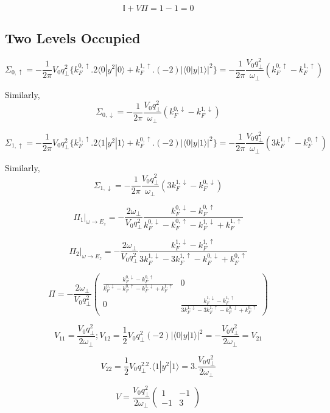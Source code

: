 \[\mathbb{I}+V\Pi=1-1=0\]

\subsection{Two Levels Occupied}

\[\Sigma_{0,\uparrow}=-\frac{1}{2\pi} V_0 q_\perp^2 \{k_F^{0,\uparrow}.2\langle 0|y^2|0\rangle + k_F^{1,\uparrow}.(-2)|\langle 0|y|1\rangle|^2\}=-\frac{1}{2\pi} \frac{V_0 q_\perp^2}{\omega_{\perp}}(k_F^{0,\uparrow}-k_F^{1,\uparrow})\]

Similarly,
\[\Sigma_{0,\downarrow}=-\frac{1}{2\pi} \frac{V_0 q_\perp^2}{\omega_{\perp}} (k_F^{0,\downarrow}-k_F^{1,\downarrow})\]

\[\Sigma_{1,\uparrow}=-\frac{1}{2\pi} V_0 q_\perp^2 \{k_F^{1,\uparrow}.2\langle 1|y^2|1\rangle + k_F^{0,\uparrow}.(-2) |\langle 0|y|1\rangle|^2 \} = -\frac{1}{2\pi} \frac{V_0 q_\perp^2}{\omega_{\perp}} (3k_F^{1,\uparrow}-k_F^{0,\uparrow})\]

Similarly, 
\[\Sigma_{1,\downarrow}=-\frac{1}{2\pi} \frac{V_0 q_\perp^2}{\omega_{\perp}} (3k_F^{1,\downarrow}-k_F^{0,\downarrow})\]

\[\Pi_1|_{\omega\rightarrow E_z}=-\frac{2\omega_{\perp}}{V_0 q_\perp^2} \frac{k_F^{0,\downarrow}-k_F^{0,\uparrow}}{k_F^{0,\downarrow}-k_F^{0,\uparrow}-k_F^{1,\downarrow}+k_F^{1,\uparrow}}\]

\[\Pi_2|_{\omega\rightarrow E_z}=-\frac{2\omega_{\perp}}{V_0 q_\perp^2} \frac{k_F^{1,\downarrow}-k_F^{1,\uparrow}}{3k_F^{1,\downarrow}-3k_F^{1,\uparrow}-k_F^{0,\downarrow}+k_F^{0,\uparrow}}\]

\[\Pi=-\frac{2\omega_{\perp}}{V_0 q_\perp^2} 
\left(\begin{matrix}
	\frac{k_F^{0,\downarrow}-k_F^{0,\uparrow}}{k_F^{0,\downarrow}-k_F^{0,\uparrow}-k_F^{1,\downarrow}+k_F^{1,\uparrow}} & 0 \\
	0 & \frac{k_F^{1,\downarrow}-k_F^{1,\uparrow}}{3k_F^{1,\downarrow}-3k_F^{1,\uparrow}-k_F^{0,\downarrow}+k_F^{0,\uparrow}}
\end{matrix}\right)\]

\[V_{11}=\frac{V_0 q_\perp^2}{2\omega_{\perp}}; V_{12}=\frac{1}{2} V_0 q_\perp^2 (-2) |\langle 0|y|1\rangle|^2=-\frac{V_0 q_\perp^2}{2\omega_{\perp}}=V_{21} \]

\[V_{22}=\frac{1}{2} V_0 q_\perp^2.2.\langle 1|y^2|1\rangle=3.\frac{V_0 q_\perp^2}{2\omega_{\perp}}\]

\[V=\frac{V_0 q_\perp^2}{2\omega_{\perp}} \left(
	\begin{matrix}
		1 & -1 \\
		-1 & 3
	\end{matrix} \right) \]
	
